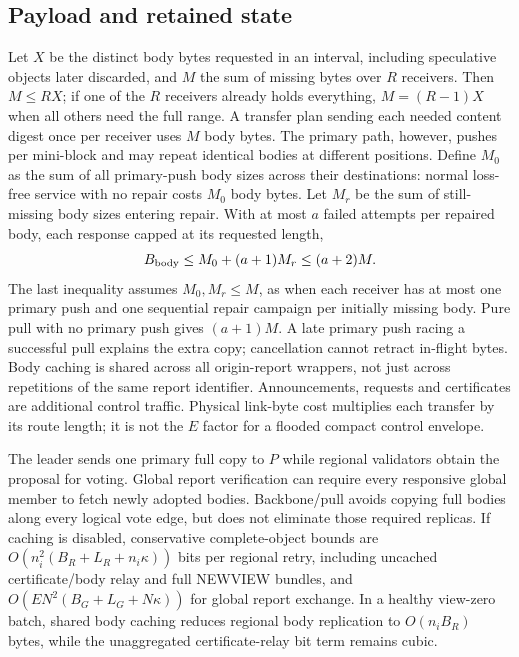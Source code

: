\documentclass[11pt,a4paper,onecolumn]{article}
\theoremstyle{remark}\newtheorem{example}[definition]{Example}
\begin{document}
\subsection{Payload and retained state}\label{sec:payloadcost}
Let $X$ be the distinct body bytes requested in an interval, including speculative
objects later discarded, and $M$ the sum of missing bytes over $R$ receivers.
Then $M\leq RX$; if one of the $R$ receivers already holds everything,
$M=(R-1)X$ when all others need the full range. A transfer plan sending each
needed content digest once per receiver uses $M$ body bytes. The primary path,
however, pushes per mini-block and may repeat identical bodies at different
positions. Define $M_0$ as the sum of all primary-push body sizes across their
destinations: normal loss-free service with no repair costs $M_0$ body bytes.
Let $M_r$ be the sum of still-missing
body sizes entering repair. With at most $a$ failed attempts per repaired body,
each response capped at its requested length,
\begin{equation}\label{eq:payload}
 B_{\rm body}\leq M_0+(a+1)M_r\leq(a+2)M.
\end{equation}
The last inequality assumes $M_0,M_r\leq M$, as when each receiver has at most
one primary push and one sequential repair campaign per initially missing body.
Pure pull with no primary push gives $(a+1)M$. A late primary push racing a
successful pull explains the extra copy; cancellation cannot retract in-flight
bytes. Body caching is shared across all origin-report wrappers, not just
across repetitions of the same report identifier.
Announcements, requests and certificates are additional control traffic.
Physical link-byte cost multiplies each transfer by its route length; it is
not the $E$ factor for a flooded compact control envelope.

The leader sends one primary full copy to $P$ while regional validators obtain
the proposal for voting. Global report verification can require every responsive
global member to fetch newly adopted bodies. Backbone/pull avoids copying full
bodies along every logical vote edge, but does not eliminate those required
replicas. If caching is disabled, conservative complete-object bounds are
$O(n_i^2(B_R+L_R+n_i\kappa))$ bits per regional retry, including
uncached certificate/body relay and full NEWVIEW bundles, and
$O(EN^2(B_G+L_G+N\kappa))$ for global report exchange. In a healthy view-zero
batch, shared body caching reduces regional body replication to $O(n_iB_R)$
bytes, while the unaggregated certificate-relay bit term remains cubic.
\end{document}
